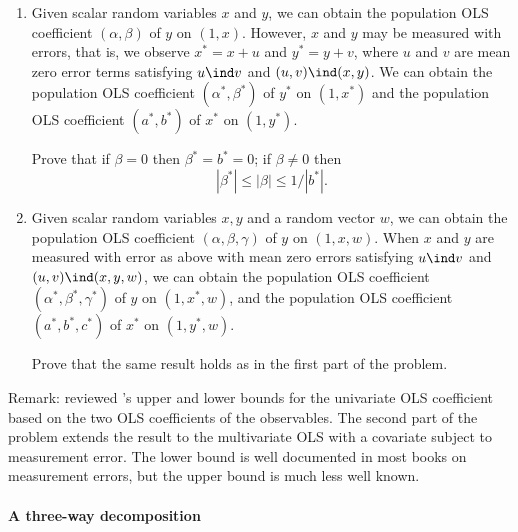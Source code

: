 \begin{enumerate}
\item
Given scalar random variables $x$ and $y$, we can obtain the population OLS coefficient $(\alpha, \beta)$ of $y$ on $(1,x)$. However, $x$ and $y$ may be measured with errors, that is, we observe $x^* = x + u$ and $y^* = y + v$, where $u$ and $v$ are mean zero error terms satisfying $u\ind v$  and $(u ,v )\ind (x,y)$. We can obtain the population OLS coefficient $(\alpha^*, \beta^*)$ of $y^*$ on $(1,x^*)$ and the population OLS coefficient $(a^*, b^*)$ of $x^*$ on $(1,y^*)$. 

 Prove that if $\beta = 0$ then $ \beta^*  =b^* = 0 $; if $\beta \neq  0$ then
$$ 
| \beta^* | \leq |\beta | \leq 
1 / |  b^* |   .
$$





\item
Given scalar random variables $x, y$ and a random vector $w$, we can obtain the population OLS coefficient $(\alpha, \beta, \gamma)$ of $y$ on $(1,x,w)$. When $x$ and $y$ are measured with error as above with mean zero errors satisfying $u\ind v$ and  $(u ,v )\ind (x,y,w)$, we can obtain the population OLS coefficient $(\alpha^*, \beta^*, \gamma^*)$ of $y$ on $(1,x^*,w)$, and the population OLS coefficient $(a^*, b^*, c^*)$ of $x^*$ on $(1,y^*,w)$.

Prove that the same result holds as in the first part of the problem. 
\end{enumerate}




Remark: \citet{tamer2010partial} reviewed \citet{frisch1934statistical}'s upper and lower bounds for the univariate OLS coefficient based on the two OLS coefficients of the observables. The second part of the problem extends the result to the multivariate OLS with a covariate subject to measurement error. The lower bound is well documented in most books on measurement errors, but the upper bound is much less well known. 




\paragraph{A three-way decomposition}\label{hw11::three-way-ols}


